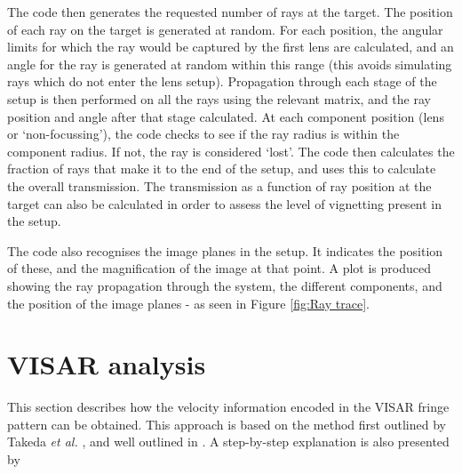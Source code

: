 The code then generates the requested number of rays at the target. The position of each ray on the target is generated at random. For each position, the angular limits for which the ray would be captured by the first lens are calculated, and an angle for the ray is generated at random within this range (this avoids simulating rays which do not enter the lens setup). Propagation through each stage of the setup is then performed on all the rays using the relevant matrix, and the ray position and angle after that stage calculated. At each component position (lens or `non-focussing'), the code checks to see if the ray radius is within the component radius. If not, the ray is considered `lost'. The code then calculates the fraction of rays that make it to the end of the setup, and uses this to calculate the overall transmission. The transmission as a function of ray position at the target can also be calculated in order to assess the level of vignetting present in the setup.

The code also recognises the image planes in the setup. It indicates the position of these, and the magnification of the image at that point. A plot is produced showing the ray propagation through the system, the different components, and the position of the image planes - as seen in Figure \ref{fig:Ray trace}.

\section{VISAR analysis}
\label{appdx: VISAR analysis}
This section describes how the velocity information encoded in the VISAR fringe pattern can be obtained. This approach is based on the method first outlined by Takeda \textit{et al.} \cite{Takeda1982}, and well outlined in \cite{Celliers2004}. A step-by-step explanation is also presented by \cite{Hammel2017}

